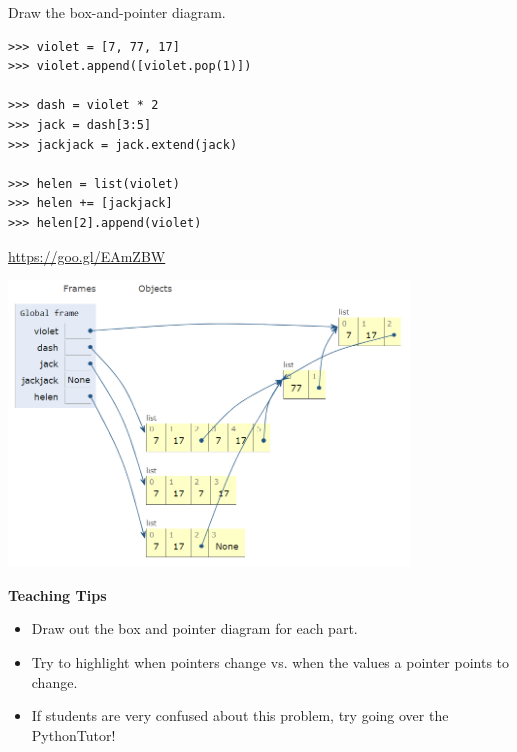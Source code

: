 \begin{blocksection}
\question Draw the box-and-pointer diagram. \\

\begin{lstlisting}
>>> violet = [7, 77, 17]
>>> violet.append([violet.pop(1)])

>>> dash = violet * 2
>>> jack = dash[3:5]
>>> jackjack = jack.extend(jack)

>>> helen = list(violet)
>>> helen += [jackjack]
>>> helen[2].append(violet)
\end{lstlisting}

\begin{solution}[1in]
\url{https://goo.gl/EAmZBW}

\includegraphics[width=0.8\textwidth]{incredibles.png}
\end{solution}
\end{blocksection}

\begin{guide}
    \textbf{Teaching Tips}
    \begin{itemize}
       \item Draw out the box and pointer diagram for each part.
       \item Try to highlight when pointers change vs. when the values a pointer points to change.
       \item If students are very confused about this problem, try going over the PythonTutor!
    \end{itemize}
 \end{guide}
